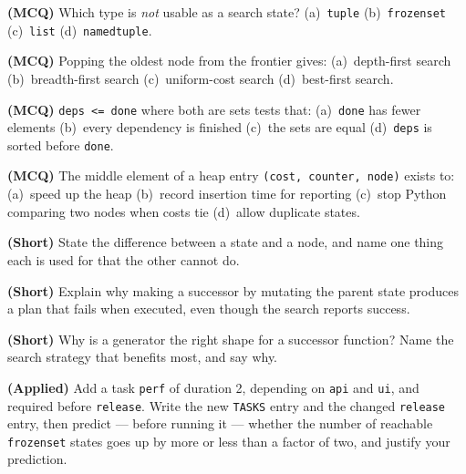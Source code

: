 \begin{reviewq}
  \item \textbf{(MCQ)} Which type is \emph{not} usable as a search state?
        (a)~\texttt{tuple} (b)~\texttt{frozenset} (c)~\texttt{list}
        (d)~\texttt{namedtuple}.
  \item \textbf{(MCQ)} Popping the oldest node from the frontier gives:
        (a)~depth-first search (b)~breadth-first search (c)~uniform-cost search
        (d)~best-first search.
  \item \textbf{(MCQ)} \texttt{deps <= done} where both are sets tests that:
        (a)~\texttt{done} has fewer elements (b)~every dependency is finished
        (c)~the sets are equal (d)~\texttt{deps} is sorted before \texttt{done}.
  \item \textbf{(MCQ)} The middle element of a heap entry
        \texttt{(cost, counter, node)} exists to: (a)~speed up the heap
        (b)~record insertion time for reporting (c)~stop Python comparing two
        nodes when costs tie (d)~allow duplicate states.
  \item \textbf{(Short)} State the difference between a state and a node, and name
        one thing each is used for that the other cannot do.
  \item \textbf{(Short)} Explain why making a successor by mutating the parent
        state produces a plan that fails when executed, even though the search
        reports success.
  \item \textbf{(Short)} Why is a generator the right shape for a successor
        function? Name the search strategy that benefits most, and say why.
  \item \textbf{(Applied)} Add a task \texttt{perf} of duration 2, depending on
        \texttt{api} and \texttt{ui}, and required before \texttt{release}. Write
        the new \texttt{TASKS} entry and the changed \texttt{release} entry, then
        predict --- before running it --- whether the number of reachable
        \texttt{frozenset} states goes up by more or less than a factor of two,
        and justify your prediction.
\end{reviewq}
